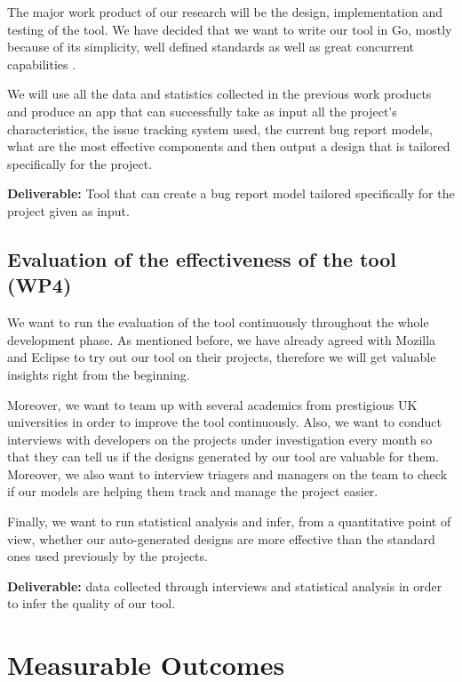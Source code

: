 \documentclass[11pt,english,twocolumn]{article}
\begin{document}
The major work product of our research will be the design, implementation and testing of the 
tool. We have decided that we want to write our tool in Go, mostly because of its 
simplicity, well defined standards as well as great concurrent capabilities \cite{forsby2015evaluation}.

We will use all the data and statistics collected in the previous work products and produce
an app that can successfully take as input all the project's characteristics, the issue tracking
system used, the current bug report models, what are the most effective components and then 
output a design that is tailored specifically for the project.

\textbf{Deliverable:} Tool that can create a bug report model tailored specifically for the 
project given as input.

\subsection*{Evaluation of the effectiveness of the tool (WP4)}

We want to run the evaluation of the tool continuously throughout the whole development phase. 
As mentioned before, we have already agreed with Mozilla and Eclipse to try out our tool on 
their projects, therefore we will get valuable insights right from the beginning.

Moreover, we want to team up with several academics from prestigious UK universities in order 
to improve the tool continuously. Also, we want to conduct interviews with developers on the 
projects under investigation every month so that they can tell us if the designs generated 
by our tool are valuable for them. Moreover, we also want to interview triagers and managers 
on the team to check if our models are helping them track and manage the project easier.

Finally, we want to run statistical analysis and infer, from a quantitative point of view,
whether our auto-generated designs are more effective than the standard ones used previously 
by the projects.

\textbf{Deliverable:} data collected through interviews and statistical analysis in order 
to infer the quality of our tool.

\section{Measurable Outcomes}
\end{document}
